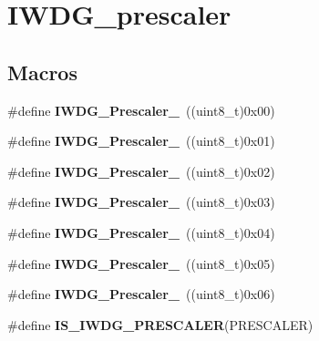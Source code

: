 \hypertarget{group___i_w_d_g__prescaler}{}\section{I\+W\+D\+G\+\_\+prescaler}
\label{group___i_w_d_g__prescaler}
\subsection*{Macros}
\begin{DoxyCompactItemize}
\item 
\hypertarget{group___i_w_d_g__prescaler_ga82a058c196d5a9cd7ea2f2202b394ba0}{}\#define {\bfseries I\+W\+D\+G\+\_\+\+Prescaler\+\_}~((uint8\+\_\+t)0x00)\label{group___i_w_d_g__prescaler_ga82a058c196d5a9cd7ea2f2202b394ba0}

\item 
\hypertarget{group___i_w_d_g__prescaler_ga59763b9a127c67adf5d11474188996a1}{}\#define {\bfseries I\+W\+D\+G\+\_\+\+Prescaler\+\_}~((uint8\+\_\+t)0x01)\label{group___i_w_d_g__prescaler_ga59763b9a127c67adf5d11474188996a1}

\item 
\hypertarget{group___i_w_d_g__prescaler_gafa81d30511ff5ec74bb38ed71f5bb66e}{}\#define {\bfseries I\+W\+D\+G\+\_\+\+Prescaler\+\_}~((uint8\+\_\+t)0x02)\label{group___i_w_d_g__prescaler_gafa81d30511ff5ec74bb38ed71f5bb66e}

\item 
\hypertarget{group___i_w_d_g__prescaler_gaa8b091b6e4102513b1e3a1c4eb6756ba}{}\#define {\bfseries I\+W\+D\+G\+\_\+\+Prescaler\+\_}~((uint8\+\_\+t)0x03)\label{group___i_w_d_g__prescaler_gaa8b091b6e4102513b1e3a1c4eb6756ba}

\item 
\hypertarget{group___i_w_d_g__prescaler_ga7ea813c73ae0acb40acb60e7d3956910}{}\#define {\bfseries I\+W\+D\+G\+\_\+\+Prescaler\+\_}~((uint8\+\_\+t)0x04)\label{group___i_w_d_g__prescaler_ga7ea813c73ae0acb40acb60e7d3956910}

\item 
\hypertarget{group___i_w_d_g__prescaler_gaea6bf96c2fd5a6f3b9574e7898096641}{}\#define {\bfseries I\+W\+D\+G\+\_\+\+Prescaler\+\_}~((uint8\+\_\+t)0x05)\label{group___i_w_d_g__prescaler_gaea6bf96c2fd5a6f3b9574e7898096641}

\item 
\hypertarget{group___i_w_d_g__prescaler_ga7d6e918748185639049644c970db2b43}{}\#define {\bfseries I\+W\+D\+G\+\_\+\+Prescaler\+\_}~((uint8\+\_\+t)0x06)\label{group___i_w_d_g__prescaler_ga7d6e918748185639049644c970db2b43}

\item 
\#define {\bfseries I\+S\+\_\+\+I\+W\+D\+G\+\_\+\+P\+R\+E\+S\+C\+A\+L\+E\+R}(P\+R\+E\+S\+C\+A\+L\+E\+R)
\end{DoxyCompactItemize}



